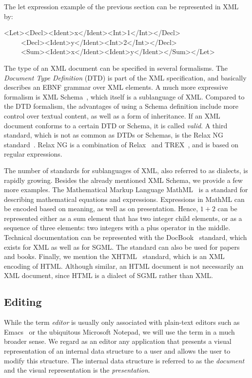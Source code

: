\documentclass{speauth}
\begin{document}
The let expression example of the previous section can be represented in XML by:

\ttfamily\begin{small}\begin{tabbing}

<Let><Decl><Ident>x</Ident><Int>1</Int></Decl>\\

~~~~~<Decl><Ident>y</Ident><Int>2</Int></Decl>\\

~~~~~<Sum><Ident>x</Ident><Ident>y</Ident></Sum></Let>

\end{tabbing}\end{small}\rmfamily

The type of an XML document can be specified in several formalisms. The {\em Document Type Definition} (DTD) is part of the XML specification, and basically describes an EBNF grammar over XML elements. A much more expressive formalism is XML Schema~\cite{xmlSchema1}, which itself is a sublanguage of XML. Compared to the DTD formalism, the advantages of using a Schema definition include more control over textual content, as well as a form of inheritance. If an XML document conforms to a certain DTD or Schema, it is called {\em valid}. A third standard, which is not as common as DTDs or Schemas, is the Relax NG standard~\cite{relaxNG01}. Relax NG is a combination of Relax~\cite{relax01} and TREX~\cite{trex01}, and is based on regular expressions. 

The number of standards for sublanguages of XML, also referred to as dialects, is rapidly growing. Besides the already mentioned XML Schema, we provide a few more examples. The Mathematical Markup Language MathML~\cite{mathml20} is a standard for describing mathematical equations and expressions.  \bc Expressions in MathML can be encoded based on  meaning, as well as on presentation. Hence, $1+2$ can be represented either as a sum  element that has two integer child elements, or as a sequence of three elements: two integers with a plus operator in the middle.  \ec Technical documentation can be represented with the DocBook~\cite{walsh02docbook} standard, which exists for XML as well as for SGML. The standard can also be used for papers and books. Finally, we mention the XHTML~\cite{xhtml11} standard, which is an XML encoding of HTML. Although similar, an HTML document is not necessarily an XML document, since HTML is a dialect of SGML rather than XML.

\subsection{Editing}
\label{sect:editing}
While the term {\em editor} is usually only associated with plain-text editors such as Emacs~\cite{stallman81emacs} or the ubiquitous Microsoft Notepad, we will use the term in a much broader sense. We regard as an editor any application that presents a visual representation of an internal data structure to a user and allows the user to modify this structure. The internal data structure is referred to as the {\em document} and the visual representation is the {\em presentation}. 
\end{document}

